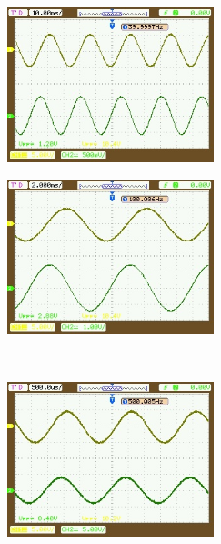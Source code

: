\documentclass[a4paper,11pt]{jsarticle}
\begin{document}
\begin{figure}[H]
  \begin{center}
    \begin{minipage}{0.48\textwidth}
      \begin{center}
        \includegraphics[clip,width=6cm]{picture/HPF/40.jpeg}
      \end{center}
      \label{P:HPF_40}
    \end{minipage}
    \begin{minipage}{0.48\textwidth}
      \begin{center}
        \includegraphics[clip,width=6cm]{picture/HPF/100.jpeg}
      \end{center}
      \label{P:HPF_100}
    \end{minipage} \\
    \begin{minipage}{0.48\textwidth}
      \begin{center}
        \includegraphics[clip,width=6cm]{picture/HPF/500.jpeg}
      \end{center}

\end{minipage}
\end{center}
\end{figure}
\end{document}
